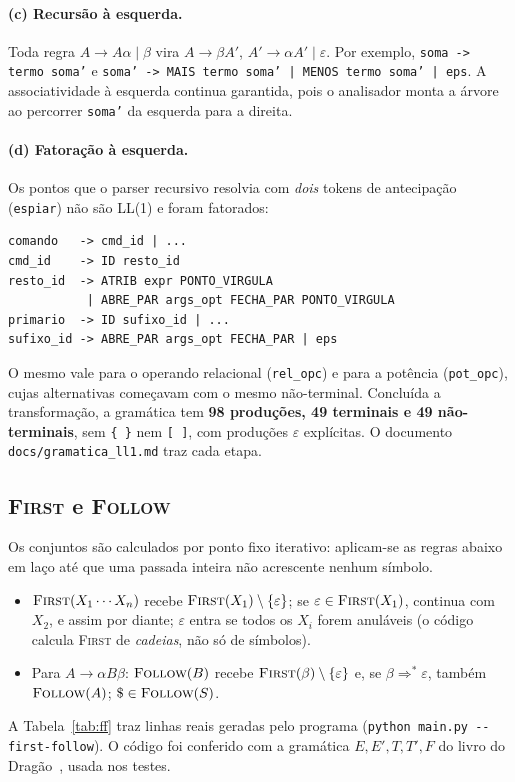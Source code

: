 \documentclass[conference]{IEEEtran}
\begin{document}
\paragraph{(c) Recursão à esquerda.} Toda regra $A \to A\alpha \mid \beta$ vira
$A \to \beta A'$, $A' \to \alpha A' \mid \varepsilon$. Por exemplo,
\texttt{soma -> termo soma'} e
\texttt{soma' -> MAIS termo soma' | MENOS termo soma' | eps}. A associatividade
à esquerda continua garantida, pois o analisador monta a árvore ao percorrer
\texttt{soma'} da esquerda para a direita.

\paragraph{(d) Fatoração à esquerda.} Os pontos que o parser recursivo resolvia
com \emph{dois} tokens de antecipação (\texttt{espiar}) não são LL(1) e foram
fatorados:
\begin{lstlisting}[style=ebnf,numbers=none]
comando   -> cmd_id | ...
cmd_id    -> ID resto_id
resto_id  -> ATRIB expr PONTO_VIRGULA
           | ABRE_PAR args_opt FECHA_PAR PONTO_VIRGULA
primario  -> ID sufixo_id | ...
sufixo_id -> ABRE_PAR args_opt FECHA_PAR | eps
\end{lstlisting}
O mesmo vale para o operando relacional (\texttt{rel\_opc}) e para a potência
(\texttt{pot\_opc}), cujas alternativas começavam com o mesmo não-terminal.
Concluída a transformação, a gramática tem \textbf{98 produções, 49 terminais e
49 não-terminais}, sem \texttt{\{ \}} nem \texttt{[ ]}, com produções $\varepsilon$
explícitas. O documento \texttt{docs/gramatica\_ll1.md} traz cada etapa.

\subsection{\textsc{First} e \textsc{Follow}}\label{sec:firstfollow}
Os conjuntos são calculados por ponto fixo iterativo: aplicam-se as regras
abaixo em laço até que uma passada inteira não acrescente nenhum símbolo.
\begin{itemize}
\item $\textsc{First}(X_1\cdots X_n)$ recebe $\textsc{First}(X_1)\setminus\{\varepsilon\}$;
se $\varepsilon\in\textsc{First}(X_1)$, continua com $X_2$, e assim por diante;
$\varepsilon$ entra se todos os $X_i$ forem anuláveis (o código calcula
\textsc{First} de \emph{cadeias}, não só de símbolos).
\item Para $A\to\alpha B\beta$: $\textsc{Follow}(B)$ recebe
$\textsc{First}(\beta)\setminus\{\varepsilon\}$ e, se $\beta\Rightarrow^*\varepsilon$,
também $\textsc{Follow}(A)$; $\$\in\textsc{Follow}(S)$.
\end{itemize}
A Tabela~\ref{tab:ff} traz linhas reais geradas pelo programa
(\texttt{python main.py -{}-first-follow}). O código foi conferido com a gramática
$E,E',T,T',F$ do livro do Dragão~\cite{aho2006}, usada nos testes.
\end{document}
